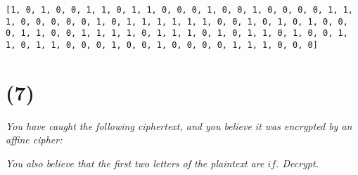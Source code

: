 \documentclass[12pt]{article}
\begin{document}
\texttt{[1, 0, 1, 0, 0, 1, 1, 0, 1, 1, 0, 0, 0, 1, 0, 0, 1, 0, 0, 0, 0, 1, 1,
1, 0, 0, 0, 0, 0, 1, 0, 1, 1, 1, 1, 1, 1, 0, 0, 1, 0, 1, 0, 1, 0, 0,
0, 1, 1, 0, 0, 1, 1, 1, 1, 0, 1, 1, 1, 0, 1, 0, 1, 1, 0, 1, 0, 0, 1,
1, 0, 1, 1, 0, 0, 0, 1, 0, 0, 1, 0, 0, 0, 0, 1, 1, 1, 0, 0, 0]}

\section*{(7)} \textit{You have caught the following ciphertext, and you believe it was encrypted by an affine cipher:}


\textit{You also believe that the first two letters of the plaintext are $if$. Decrypt.}
\end{document}
